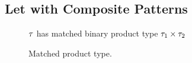 \subsection{Let with Composite Patterns}
\label{sec:calculus-let}

\begin{figure}[htbp]
  \raggedright
   $\TMV$ has matched binary product type $\TPair{\TMV_1}{\TMV_2}$
  \begin{mathpar}

  \end{mathpar}
  \caption{Matched product type.}
  \label{fig:calculus-matched-product}
\end{figure}

